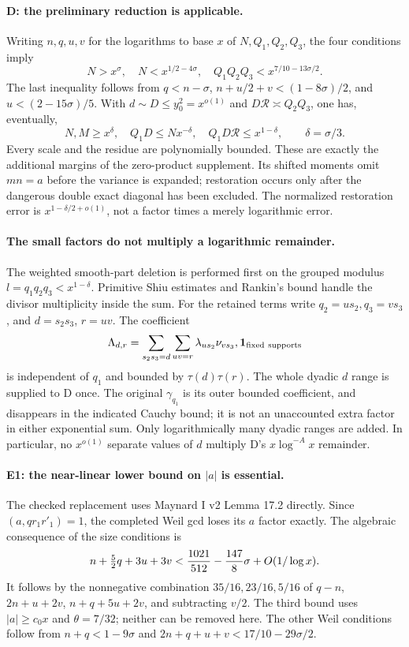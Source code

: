 \paragraph{D: the preliminary reduction is applicable.}
Writing $n,q,u,v$ for the logarithms to base $x$ of $N,Q_1,Q_2,Q_3$,
the four conditions imply
\[
 N>x^\sigma,\quad N<x^{1/2-4\sigma},\quad
 Q_1Q_2Q_3<x^{7/10-13\sigma/2}.
\]
The last inequality follows from $q<n-\sigma$,
$n+u/2+v<(1-8\sigma)/2$, and $u<(2-15\sigma)/5$.
With $d\sim D\leq y_0^2=x^{o(1)}$ and
$D\mathcal R\asymp Q_2Q_3$, one has, eventually,
\[
 N,M\geq x^{\delta},\quad Q_1D\leq Nx^{-\delta},\quad
 Q_1D\mathcal R\leq x^{1-\delta},\qquad\delta=\sigma/3.
\]
Every scale and the residue are polynomially bounded.  These are
exactly the additional margins of the zero-product supplement.
Its shifted moments omit $mn=a$ before the variance is expanded;
restoration occurs only after the dangerous double exact diagonal
has been excluded.  The normalized restoration error is
$x^{1-\delta/2+o(1)}$, not a factor times a merely logarithmic error.

\paragraph{The small factors do not multiply a logarithmic remainder.}
The weighted smooth-part deletion is performed first on the grouped
modulus $l=q_1q_2q_3<x^{1-\delta}$.  Primitive Shiu estimates and
Rankin's bound handle the divisor multiplicity inside the sum.
For the retained terms write $q_2=us_2,q_3=vs_3$, and
$d=s_2s_3$, $r=uv$.  The coefficient
\[
 \Lambda_{d,r}=\sum_{s_2s_3=d}\sum_{uv=r}
              \lambda_{us_2}\nu_{vs_3},\mathbf1_{\rm fixed\ supports}
\]
is independent of $q_1$ and bounded by $\tau(d)\tau(r)$.
The whole dyadic $d$ range is supplied to D once.  The original
$\gamma_{q_1}$ is its outer bounded coefficient, and disappears in
the indicated Cauchy bound; it is not an unaccounted extra factor
in either exponential sum.  Only logarithmically many dyadic ranges
are added.  In particular, no $x^{o(1)}$ separate values of $d$
multiply D's $x\log^{-A}x$ remainder.

\paragraph{E1: the near-linear lower bound on $|a|$ is essential.}
The checked replacement uses Maynard I v2 Lemma 17.2 directly.
Since $(a,qr_1r'_1)=1$, the completed Weil gcd loses its $a$ factor
exactly.  The algebraic consequence of the size conditions is
\[
 n+\tfrac52q+3u+3v
 <{1021\over512}-{147\over8}\sigma+O(1/\log x).
\]
It follows by the nonnegative combination $35/16,23/16,5/16$
of $q-n$, $2n+u+2v$, $n+q+5u+2v$, and subtracting $v/2$.
The third bound uses $|a|\geq c_0x$ and $\theta=7/32$;
neither can be removed here.  The other Weil conditions follow from
$n+q<1-9\sigma$ and $2n+q+u+v<17/10-29\sigma/2$.

